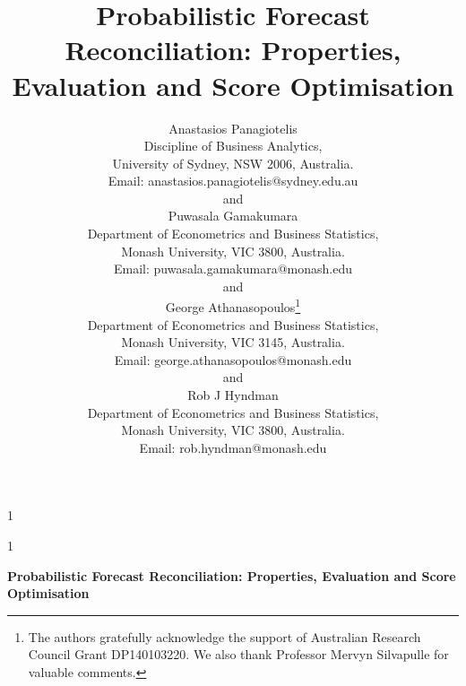 \documentclass[a4paper,12pt]{article}
\newcommand{\blind}{1}
\theoremstyle{definition}
\begin{document}
%

\def\spacingset#1{\renewcommand{\baselinestretch}%
{#1}\small\normalsize} \spacingset{1}



\blind
{
  \title{\bf Probabilistic Forecast Reconciliation: Properties, Evaluation and Score Optimisation }
  \author{Anastasios Panagiotelis\hspace{.2cm}\\
  Discipline of Business Analytics,\\
  University of Sydney, NSW 2006, Australia.\\
  Email: anastasios.panagiotelis@sydney.edu.au \\
  and \\
  Puwasala Gamakumara\\
  Department of Econometrics and Business Statistics,\\
  Monash University, VIC 3800, Australia.\\
  Email: puwasala.gamakumara@monash.edu \\
  and \\
  George Athanasopoulos\thanks{The authors gratefully acknowledge the support of Australian Research Council Grant DP140103220. We also thank Professor Mervyn Silvapulle for valuable comments.}\\
  Department of Econometrics and Business Statistics,\\
  Monash University, VIC 3145, Australia.\\
  Email: george.athanasopoulos@monash.edu \\
  and \\
  Rob J Hyndman\\
  Department of Econometrics and Business Statistics,\\
  Monash University, VIC 3800, Australia.\\
  Email: rob.hyndman@monash.edu \\}
  \maketitle\newpage
} \fi

\blind
{
  \bigskip
  \bigskip
  \bigskip
  \begin{center}
    {\LARGE\bf Probabilistic Forecast Reconciliation: Properties, Evaluation and Score Optimisation}
\end{center}
  \medskip
} \fi
\end{document}

